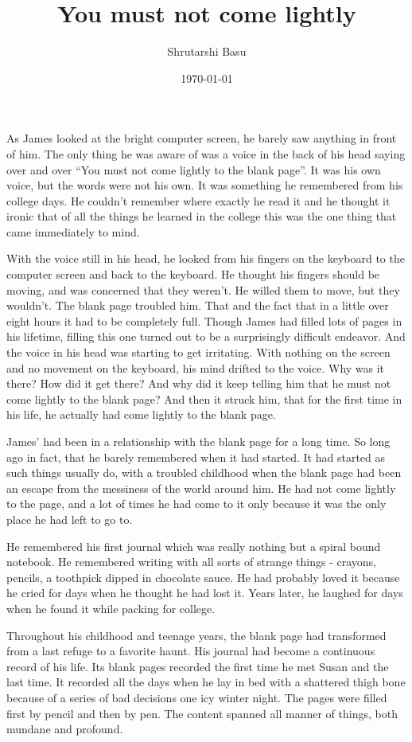 \documentclass[11pt,letterpaper]{article}
\title{You must not come lightly}
\author{Shrutarshi Basu}
\date{\today}
\begin{document}
\maketitle
\doublespacing

As James looked at the bright computer screen, he barely saw anything in front of him. The only thing he was aware of was a voice in the back of his head saying over and over  ``You must not come lightly to the blank page''. It was his own voice, but the words were not his own. It was something he remembered from his college days. He couldn't remember where exactly he read it and he thought it ironic that of all the things he learned in the college this was the one thing that came immediately to mind.

With the voice still in his head, he looked from his fingers on the keyboard to the computer screen and back to the keyboard. He thought his fingers should be moving, and was concerned that they weren't. He willed them to move, but they wouldn't. The blank page troubled him. That and the fact that in a little over eight hours it had to be completely full. Though James had filled lots of pages in his lifetime, filling this one turned out to be a surprisingly difficult endeavor. And the voice in his head was starting to get irritating. With nothing on the screen and no movement on the keyboard, his mind drifted to the voice. Why was it there? How did it get there? And why did it keep telling him that he must not come lightly to the blank page? And then it struck him, that for the first time in his life, he actually had come lightly to the blank page.

James' had been in a relationship with the blank page for a long time. So long ago in fact, that he barely remembered when it had started. It had started as such things usually do, with a troubled childhood when the blank page had been an escape from the messiness of the world around him. He had not come lightly to the page, and a lot of times he had come to it only because it was the only place he had left to go to.

He remembered his first journal which was really nothing but a spiral bound notebook. He remembered writing with all sorts of strange things - crayons, pencils, a toothpick dipped in chocolate sauce. He had probably loved it because he cried for days when he thought he had lost it. Years later, he laughed for days when he found it while packing for college.

Throughout his childhood and teenage years, the blank page had transformed from a last refuge to a favorite haunt. His journal had become a continuous record of his life. Its blank pages recorded the first time he met Susan and the last time. It recorded all the days when he lay in bed with a shattered thigh bone because of a series of bad decisions one icy winter night. The pages were filled first by pencil and then by pen. The content spanned all manner of things, both mundane and profound.
\end{document}
